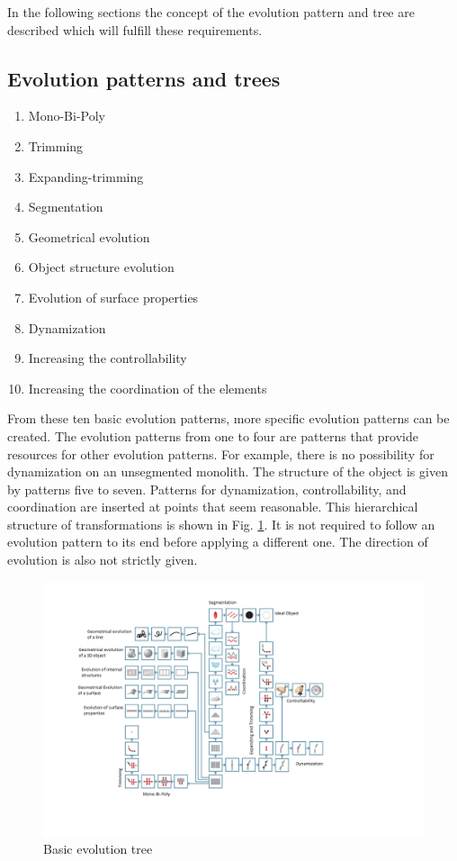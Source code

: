 \documentclass[11pt,a4paper]{article}
\begin{document}
In the following sections the concept of the evolution pattern and tree are described which will fulfill these requirements.

\subsection{Evolution patterns and trees}

\begin{enumerate}
    \item Mono-Bi-Poly
    \item Trimming
    \item Expanding-trimming
    \item Segmentation
    \item Geometrical evolution
    \item Object structure evolution
    \item Evolution of surface properties
    \item Dynamization
    \item Increasing the controllability
    \item Increasing the coordination of the elements
\end{enumerate}

From these ten basic evolution patterns, more specific evolution patterns can be created. The evolution patterns from one to four are patterns that provide resources for other evolution patterns. For example, there is no possibility for dynamization on an unsegmented monolith. The structure of the object is given by patterns five to seven. Patterns for dynamization, controllability, and coordination are inserted at points that seem reasonable. This hierarchical structure of transformations is shown in Fig. \ref{fig:basic_evo}. It is not required to follow an evolution pattern to its end before applying a different one. The direction of evolution is also not strictly given.

\begin{figure}[htb]
	\centering
	\includegraphics[width=\linewidth]{figures/basictree.png}
	\caption{\small Basic evolution tree \cite{Shpakovsky2016}}
	\label{fig:basic_evo}
\end{figure}
\end{document}
